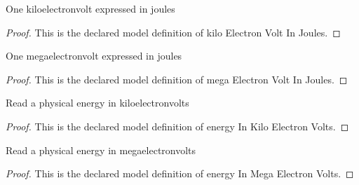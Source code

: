 \begin{definition}
  \label{def:physics:phyx-mini-0636:phyxminiproblems-problemphyxmini0636-kiloelectronvoltinjoules}
  One kiloelectronvolt expressed in joules
\end{definition}
\begin{proof}
  This is the declared model definition of kilo Electron Volt In Joules.
\end{proof}
\begin{definition}
  \label{def:physics:phyx-mini-0636:phyxminiproblems-problemphyxmini0636-megaelectronvoltinjoules}
  One megaelectronvolt expressed in joules
\end{definition}
\begin{proof}
  This is the declared model definition of mega Electron Volt In Joules.
\end{proof}
\begin{definition}
  \label{def:physics:phyx-mini-0636:phyxminiproblems-problemphyxmini0636-energyinkiloelectronvolts}
  Read a physical energy in kiloelectronvolts
\end{definition}
\begin{proof}
  This is the declared model definition of energy In Kilo Electron Volts.
\end{proof}
\begin{definition}
  \label{def:physics:phyx-mini-0636:phyxminiproblems-problemphyxmini0636-energyinmegaelectronvolts}
  Read a physical energy in megaelectronvolts
\end{definition}
\begin{proof}
  This is the declared model definition of energy In Mega Electron Volts.
\end{proof}
